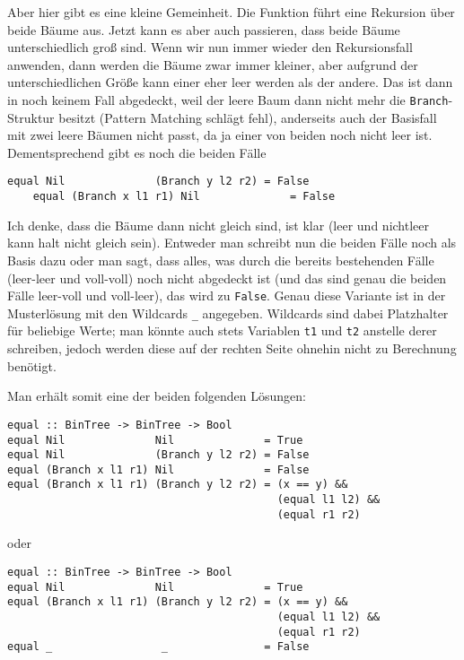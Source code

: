 \documentclass[ngerman, a4paper, 11pt]{article}
\theoremstyle{nonumberplain}
\begin{document}
Aber hier gibt es eine kleine Gemeinheit. Die Funktion führt eine Rekursion über beide Bäume aus. Jetzt kann es aber auch passieren, dass beide Bäume unterschiedlich groß sind. Wenn wir nun immer wieder den Rekursionsfall anwenden, dann werden die Bäume zwar immer kleiner, aber aufgrund der unterschiedlichen Größe kann einer eher leer werden als der andere. Das ist dann in noch keinem Fall abgedeckt, weil der leere Baum dann nicht mehr die \texttt{Branch}-Struktur besitzt (Pattern Matching schlägt fehl), anderseits auch der Basisfall mit zwei leere Bäumen nicht passt, da ja einer von beiden noch nicht leer ist. Dementsprechend gibt es noch die beiden Fälle
\begin{lstlisting}[style=noframe]
	equal Nil              (Branch y l2 r2) = False
	equal (Branch x l1 r1) Nil              = False
\end{lstlisting}
Ich denke, dass die Bäume dann nicht gleich sind, ist klar (leer und nichtleer kann halt nicht gleich sein). Entweder man schreibt nun die beiden Fälle noch als Basis dazu oder man sagt, dass alles, was durch die bereits bestehenden Fälle (leer-leer und voll-voll) noch nicht abgedeckt ist (und das sind genau die beiden Fälle leer-voll und voll-leer), das wird zu \texttt{False}. Genau diese Variante ist in der Musterlösung mit den Wildcards \lstinline[style=noframe]|_| angegeben. Wildcards sind dabei Platzhalter für beliebige Werte; man könnte auch stets Variablen \texttt{t1} und \texttt{t2} anstelle derer schreiben, jedoch werden diese auf der rechten Seite ohnehin nicht zu Berechnung benötigt.

Man erhält somit eine der beiden folgenden Lösungen:
\begin{lstlisting}[style=frame]
equal :: BinTree -> BinTree -> Bool
equal Nil              Nil              = True
equal Nil              (Branch y l2 r2) = False
equal (Branch x l1 r1) Nil              = False
equal (Branch x l1 r1) (Branch y l2 r2) = (x == y) && 
                                          (equal l1 l2) && 
                                          (equal r1 r2)
\end{lstlisting}
oder
\begin{lstlisting}[style=frame]
equal :: BinTree -> BinTree -> Bool
equal Nil              Nil              = True
equal (Branch x l1 r1) (Branch y l2 r2) = (x == y) && 
                                          (equal l1 l2) && 
                                          (equal r1 r2)
equal _                 _               = False
\end{lstlisting}
\end{document}
